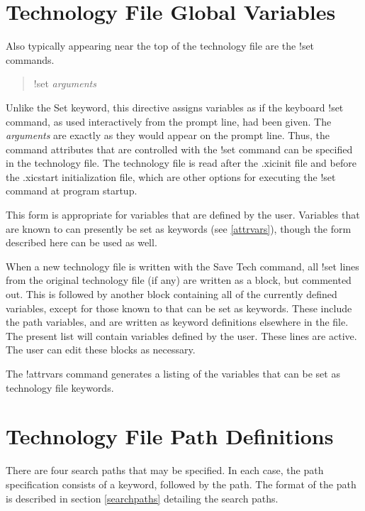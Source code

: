 \section{Technology File Global Variables}

Also typically appearing near the top of the technology file are
the {\vt !set} commands.
\begin{quote}
{\vt !set} {\it arguments}
\end{quote}
Unlike the {\vt Set} keyword, this directive assigns variables as if
the keyboard {\cb !set} command, as used interactively from the prompt
line, had been given.  The {\it arguments} are exactly as they would
appear on the prompt line.  Thus, the command attributes that are
controlled with the {\cb !set} command can be specified in the
technology file.  The technology file is read after the {\vt .xicinit}
file and before the {\vt .xicstart} initialization file, which are
other options for executing the {\cb !set} command at program startup.

This form is appropriate for variables that are defined by the user. 
Variables that are known to {\Xic} can presently be set as keywords
(see \ref{attrvars}), though the form described here can be used as
well.

When a new technology file is written with the {\cb Save Tech}
command, all {\cb !set} lines from the original technology file (if
any) are written as a block, but commented out.  This is followed by
another block containing all of the currently defined variables,
except for those known to {\Xic} that can be set as keywords.  These
include the path variables, and are written as keyword definitions
elsewhere in the file.  The present list will contain variables
defined by the user.  These lines are active.  The user can edit these
blocks as necessary.

The {\cb !attrvars} command generates a listing of the variables that
can be set as technology file keywords.


\section{Technology File Path Definitions}

There are four search paths that may be specified.  In each case, the
path specification consists of a keyword, followed by the path.  The
format of the path is described in section \ref{searchpaths}
detailing the {\Xic} search paths.

